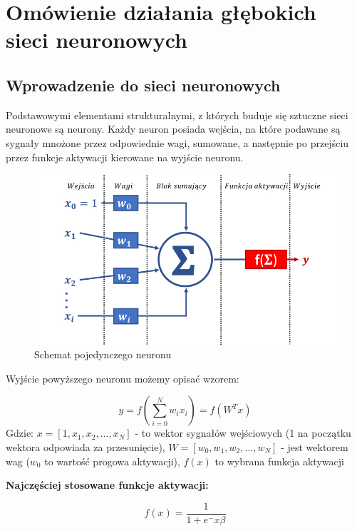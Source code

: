 \section{Omówienie działania głębokich sieci neuronowych}
\subsection{Wprowadzenie do sieci neuronowych}

Podstawowymi elementami strukturalnymi, z których buduje się sztuczne sieci 
neuronowe są neurony. Każdy neuron posiada wejścia, na które podawane są 
sygnały mnożone przez odpowiednie wagi, sumowane, a następnie po przejściu przez 
funkcje aktywacji kierowane na wyjście neuronu. 


\begin{figure}[H]
	\centering
	\includegraphics[width=12cm]{pages/teoria/zdjecia/sztucznyNeuron.jpg}
	\caption{Schemat pojedynczego neuronu \cite{sztucznyNeuron}}
	\label{rys:ogolnyRozwiazania}
\end{figure}


Wyjście powyższego neuronu możemy opisać wzorem:

\begin{equation}
	y = f( \sum_{i = 0}^{N}w_i x_i) = f(W^T x)
	\label{eq:rownanieNeuronu}
\end{equation}
Gdzie: $x=[1, x_1, x_2, ..., x_N]$ - to wektor sygnałów wejściowych (1 na początku wektora odpowiada
za przesunięcie), $W = [w_0, w_1, w_2, ..., w_N]$ - jest wektorem wag ($w_0$ to wartość progowa aktywacji),
$f(x)$ to wybrana funkcja aktywacji

\textbf{Najczęściej stosowane funkcje aktywacji:}

\begin{equation}
	f(x) = \frac{1}{1 + e^-x\beta} 
	\label{eq:signum}
\end{equation}

